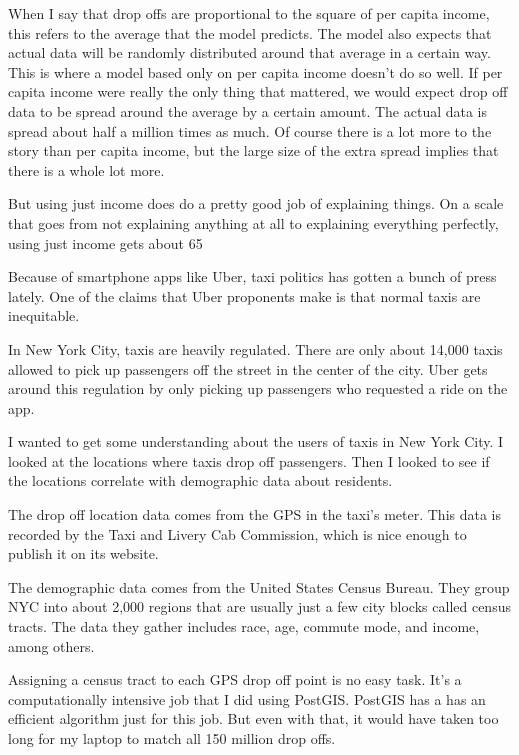 When I say that drop offs are proportional to the square of per capita income, this refers to the average that the model predicts. The model also expects that actual data will be randomly distributed around that average in a certain way. This is where a model based only on per capita income doesn't do so well. If per capita income were really the only thing that mattered, we would expect drop off data to be spread around the average by a certain amount. The actual data is spread about half a million times as much. Of course there is a lot more to the story than per capita income, but the large size of the extra spread implies that there is a whole lot more.

But using just income does do a pretty good job of explaining things. On a scale that goes from not explaining anything at all to explaining everything perfectly, using just income gets about 65%

Because of smartphone apps like Uber, taxi politics has gotten a bunch of press lately. One of the claims that Uber proponents make is that normal taxis are inequitable. 

In New York City, taxis are heavily regulated. There are only about 14,000 taxis allowed to pick up passengers off the street in the center of the city. Uber gets around this regulation by only picking up passengers who requested a ride on the app.

I wanted to get some understanding about the users of taxis in New York City.  I looked at the locations where taxis drop off passengers. Then I looked to see if the locations correlate with demographic data about residents.

The drop off location data comes from the GPS in the taxi's meter. This data is recorded by the Taxi and Livery Cab Commission, which is nice enough to publish it on its website.

The demographic data comes from the United States Census Bureau.  They group NYC into about 2,000 regions that are usually just a few city blocks called census tracts. The data they gather includes race, age, commute mode, and income, among others.

Assigning a census tract to each GPS drop off point is no easy task. It's a computationally intensive job that I did using PostGIS. PostGIS has a has an efficient algorithm just for this job. But even with that, it would have taken too long for my laptop to match all 150 million drop offs.

